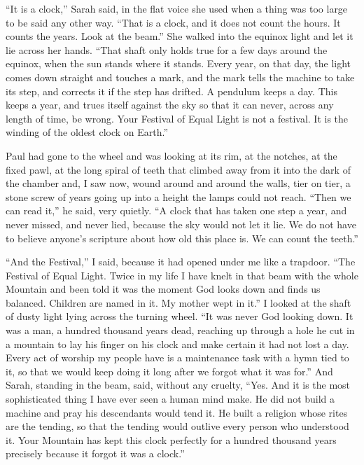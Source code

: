 \ornament

``It is a clock,'' Sarah said, in the flat voice she used when a thing was too large to be said any other way. ``That is a clock, and it does not count the hours. It counts the years. Look at the beam.'' She walked into the equinox light and let it lie across her hands. ``That shaft only holds true for a few days around the equinox, when the sun stands where it stands. Every year, on that day, the light comes down straight and touches a mark, and the mark tells the machine to take its step, and corrects it if the step has drifted. A pendulum keeps a day. This keeps a year, and trues itself against the sky so that it can never, across any length of time, be wrong. Your Festival of Equal Light is not a festival. It is the winding of the oldest clock on Earth.''\par

Paul had gone to the wheel and was looking at its rim, at the notches, at the fixed pawl, at the long spiral of teeth that climbed away from it into the dark of the chamber and, I saw now, wound around and around the walls, tier on tier, a stone screw of years going up into a height the lamps could not reach. ``Then we can read it,'' he said, very quietly. ``A clock that has taken one step a year, and never missed, and never lied, because the sky would not let it lie. We do not have to believe anyone's scripture about how old this place is. We can count the teeth.''\par

``And the Festival,'' I said, because it had opened under me like a trapdoor. ``The Festival of Equal Light. Twice in my life I have knelt in that beam with the whole Mountain and been told it was the moment God looks down and finds us balanced. Children are named in it. My mother wept in it.'' I looked at the shaft of dusty light lying across the turning wheel. ``It was never God looking down. It was a man, a hundred thousand years dead, reaching up through a hole he cut in a mountain to lay his finger on his clock and make certain it had not lost a day. Every act of worship my people have is a maintenance task with a hymn tied to it, so that we would keep doing it long after we forgot what it was for.'' And Sarah, standing in the beam, said, without any cruelty, ``Yes. And it is the most sophisticated thing I have ever seen a human mind make. He did not build a machine and pray his descendants would tend it. He built a religion whose rites are the tending, so that the tending would outlive every person who understood it. Your Mountain has kept this clock perfectly for a hundred thousand years precisely because it forgot it was a clock.''\par

